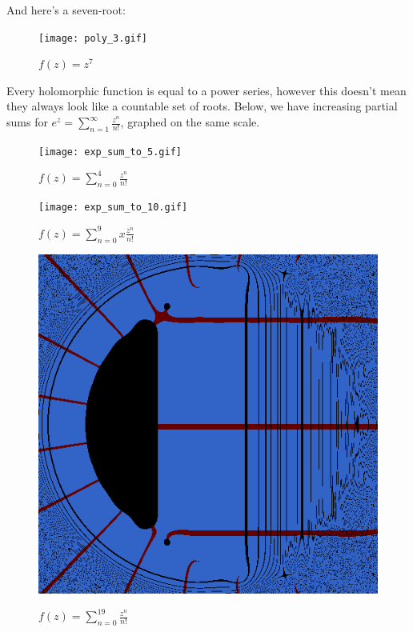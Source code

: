 \documentclass[xhtml, mathjax]{article}
\begin{document}
    And here's a seven-root:

    \begin{figure}
      \centering
      \texttt{[image: poly\_3.gif]}\par
      $f(z) = z^7$
    \end{figure}


    Every holomorphic function is equal to a power series, however this doesn't
    mean they always look like a countable set of roots. Below, we have
    increasing partial sums for $e^z = \sum_{n=1}^\infty \frac{z^n}{n!}$,
    graphed on the same scale.

    \begin{figure}
      \centering
      \texttt{[image: exp\_sum\_to\_5.gif]}\par
      $f(z) = \sum_{n=0}^4 \frac{z^n}{n!}$
    \end{figure}

    \begin{figure}
      \centering
      \texttt{[image: exp\_sum\_to\_10.gif]}\par
      $f(z) = \sum_{n=0}^9x \frac{z^n}{n!}$
    \end{figure}

    \begin{figure}
      \centering
      \includegraphics{exp_sum_to_20.gif}\par
      $f(z) = \sum_{n=0}^{19} \frac{z^n}{n!}$
    \end{figure}
\end{document}

